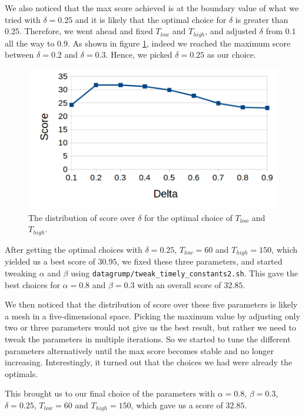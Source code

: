 \documentclass[11pt,a4paper]{article}
\begin{document}
We also noticed that the max score achieved is at the boundary value of what we
tried with $\delta=0.25$ and it is likely that the optimal choice for $\delta$ is
greater than $0.25$. Therefore, we went ahead and fixed $T_{low}$ and
$T_{high}$, and adjusted $\delta$ from $0.1$ all the way to $0.9$. As shown in
figure \ref{fig:cont2}, indeed we reached the maximum score between $\delta=0.2$
and $\delta=0.3$. Hence, we picked $\delta=0.25$ as our choice.
\begin{figure}[h]
  \centering

  \includegraphics[scale=0.46]{contest3}
  \caption{The distribution of score over $\delta$ for the optimal choice of
    $T_{low}$ and $T_{high}$. }
    \label{fig:cont2}
\end{figure}

After getting the optimal choices with $\delta = 0.25$, $T_{low}=60$ and
$T_{high}=150$, which yielded us a best score of $30.95$, we fixed these three
parameters, and started tweaking $\alpha$ and $\beta$ using
\texttt{datagrump/tweak\_timely\_constants2.sh}. This gave the best choices for
$\alpha = 0.8$ and $\beta = 0.3$ with an overall score of $32.85$.

We then noticed that the distribution of score over these five parameters is
likely a mesh in a five-dimensional space. Picking the maximum value by
adjusting only two or three parameters would not give us the best result, but
rather we need to tweak the parameters in multiple iterations. So we started to
tune the different parameters alternatively until the max score becomes stable
and no longer increasing. Interestingly, it turned out that the choices we had
were already the optimals.

This brought us to our final choice of the parameters with $\alpha=0.8$,
$\beta = 0.3$, $\delta=0.25$, $T_{low}=60$ and $T_{high}=150$, which gave us a
score of $32.85$.
\end{document}
